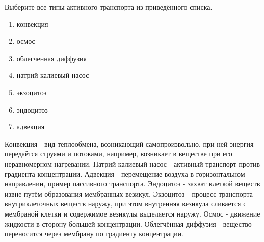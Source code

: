 
Выберите все типы активного транспорта из приведённого списка.

\begin{enumerate}
    \item конвекция
    \item осмос
    \item облегченная диффузия
    \item натрий-калиевый насос
    \item экзоцитоз
    \item эндоцитоз
    \item адвекция
   
\end{enumerate}


\explanationSection

Конвекция - вид теплообмена, возникающий самопроизвольно, при ней энергия передаётся струями и потоками, например, возникает в веществе при его неравномерном нагревании. Натрий-калиевый насос - активный транспорт против градиента концентрации. Адвекция - перемещение воздуха в горизонтальном направлении, пример пассивного транспорта. Эндоцитоз - захват клеткой веществ извне путём образования мембранных везикул. Экзоцитоз - процесс транспорта внутриклеточных веществ наружу, при этом внутренняя везикула сливается с мембраной клетки и содержимое везикулы выделяется наружу. Осмос - движение жидкости в сторону большей концентрации. Облегчённая диффузия - вещество переносится через мембрану по градиенту концентрации. 

